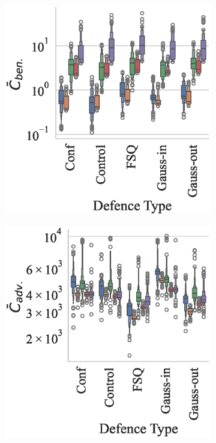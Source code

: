 \begin{figure}
    \centering
    \begin{subfigure}[]{.3\textwidth}
        \centering
        \includegraphics[width=\textwidth]{cifar/ben_failures_per_train_time_vs_defence_type.eps}
    \end{subfigure}
    \begin{subfigure}[]{0.3\textwidth}
        \includegraphics[width=\textwidth]{cifar/adv_failures_per_train_time_vs_defence_type.eps}

\end{subfigure}
\end{figure}

